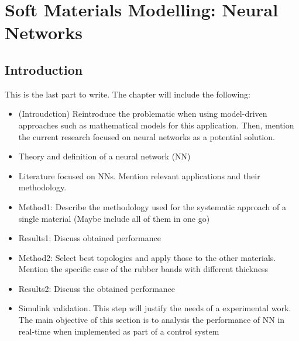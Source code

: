 \chapter{Soft Materials Modelling: Neural Networks}

\section{Introduction}

This is the last part to write. The chapter will include the following:

\begin{itemize}
    \item (Introudction) Reintroduce the problematic when using model-driven approaches such as mathematical models for this application. Then, mention the current research focused on neural networks as a potential solution.
    \item Theory and definition of a neural network (NN)
    \item Literature focused on NNs. Mention relevant applications and their methodology.
    \item Method1: Describe the methodology used for the systematic approach of a single material (Maybe include all of them in one go)
    \item Results1: Discuss obtained performance
    \item Method2: Select best topologies and apply those to the other materials. Mention the specific case of the rubber bands with different thickness
    \item Results2: Discuss the obtained performance
    \item Simulink validation. This step will justify the needs of a experimental work. The main objective of this section is to analysis the performance of NN in real-time when implemented as part of a control system
\end{itemize}

